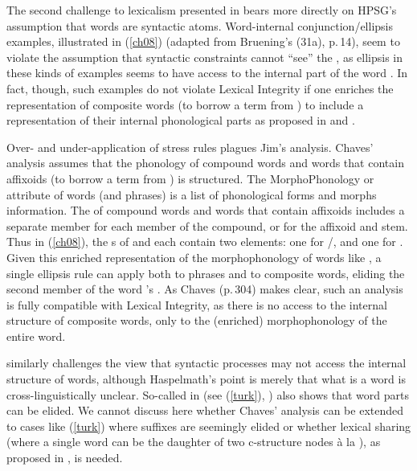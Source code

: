 \documentclass[output=paper,biblatex,babelshorthands,newtxmath,draftmode,colorlinks,citecolor=brown]{langscibook}
\begin{document}
The second challenge to lexicalism presented in \citet{Bruening2018} bears more directly on HPSG's assumption that words are syntactic atoms. Word-internal conjunction/ellipsis examples, illustrated in (\ref{ch08}) (adapted from Bruening's (31a), p.\,14), seem to violate the assumption that syntactic constraints cannot ``see'' the , as ellipsis in these kinds of examples seems to have access to the internal part of the word . In fact, though, such examples do not violate Lexical Integrity if one enriches the representation of composite words (to borrow a term from \citealt[Chapter 11]{Anderson1992}) to include a representation of their internal phonological parts as proposed in \citet{Chaves2008}  and \citet{Chaves2014}.

\ea
\label{ch08}
Over- and under-application of stress rules plagues Jim's analysis.
\z
{}%
Chaves' analysis assumes that the phonology of compound words and words that contain affixoids (to borrow a term from \citealt[114--117]{Booij2005}) is structured. The MorphoPhonology or  attribute of words (and phrases) is a list of phonological forms and morphs information. The  of compound words and words that contain affixoids includes a separate member for each member of the compound, or for the affixoid and stem.  Thus in (\ref{ch08}), the s of  and  each contain two elements: one for /, and one for . Given this enriched representation of the morphophonology of words like , a single ellipsis rule can apply both to phrases and to composite words, eliding the second member of the word 's . As Chaves (p.\,304) makes clear, such an analysis is fully compatible with Lexical Integrity, as there is no access to the internal structure of composite words, only to the (enriched) morphophonology of the entire word.

\citet{Haspelmath2011} similarly challenges the view that syntactic processes may not access the internal structure of words, although Haspelmath's point is merely that what is a word is cross-linguistically unclear. So-called  in  (see (\ref{turk}), \citealt[48]{Haspelmath2011}) also shows that word parts can be elided. We cannot discuss here whether Chaves' analysis can be extended to cases like (\ref{turk}) where suffixes are seemingly elided or whether lexical sharing (where a single word can be the daughter of two c-structure nodes \`a la \citealt{McCawley1982}), as proposed in \citet{Broadwell2008}, is needed. 
\end{document}
